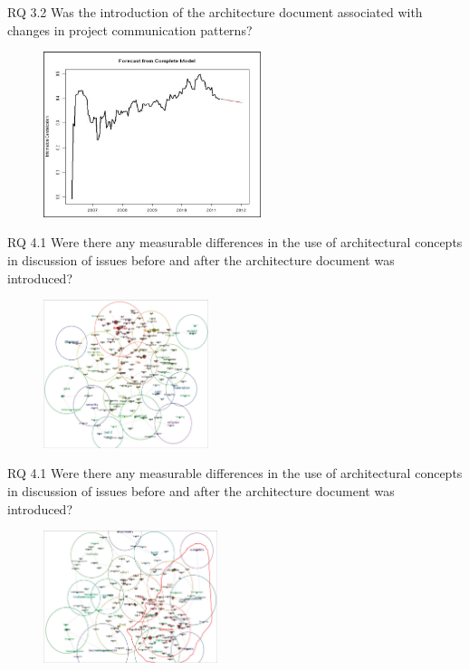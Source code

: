 \documentclass[t,14pt,mathserif]{beamer}
\begin{document}
\begin{frame}{RQ 3.2 Was the introduction of the architecture document associated with changes in project communication patterns?}
	
	\begin{figure}[!t]
		\centering
		\includegraphics[width=2.5in]{../img/centrality}
		\label{fig:promotion-table}
	\end{figure}
	
\end{frame}


\begin{frame}{RQ 4.1 Were there any measurable differences in the use of architectural concepts in discussion of issues before and after the architecture document was introduced?}
	
	\begin{figure}[!t]
		\centering
		\includegraphics[width=1.9in]{../img/concept-map-before}
		\label{fig:promotion-table}
	\end{figure}
	
\end{frame}


\begin{frame}{RQ 4.1 Were there any measurable differences in the use of architectural concepts in discussion of issues before and after the architecture document was introduced?}
	
	\begin{figure}[!t]
		\centering
		\includegraphics[width=2.0in]{../img/concept-map-after}
		\label{fig:promotion-table}
	\end{figure}
	
\end{frame}
\end{document}
